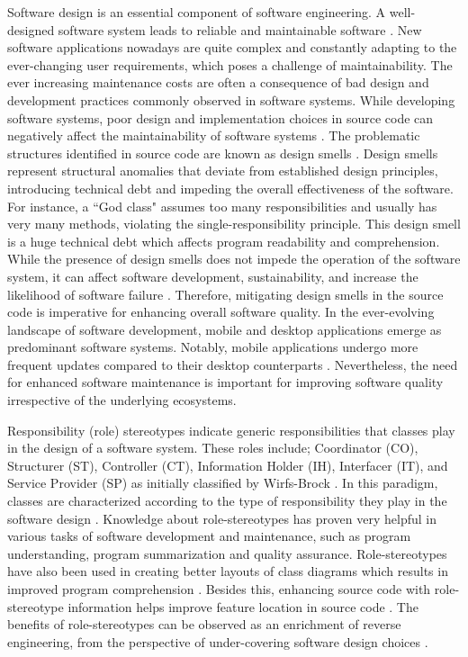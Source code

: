 \documentclass[AMA,Times1COL]{WileyNJDv5} %
\begin{document}
Software design is an essential component of software engineering. A well-designed software system leads to reliable and maintainable software \cite{imran2019design, imran2022qualitative}. New software applications nowadays are quite complex and constantly adapting to the ever-changing user requirements, which poses a challenge of maintainability. The ever increasing maintenance costs \cite{jha2019deep} are often a consequence of bad design and development practices commonly observed in software systems. While developing software systems, poor design and implementation choices in source code can negatively affect the maintainability of software systems \cite{palomba2018diffuseness}. The problematic structures identified in source code are known as design smells \cite{kaur2015influence,aversano2020empirical,imran2022qualitative}. Design smells represent structural anomalies that deviate from established design principles, introducing technical debt and impeding the overall effectiveness of the software. For instance, a ``God class" assumes too many responsibilities and usually has very many methods, violating the single-responsibility principle. This design smell is a huge technical debt which affects program readability and comprehension. While the presence of design smells does not impede the operation of the software system, it can affect software development, sustainability, and increase the likelihood of software failure \cite{turkistani2019reducing}. Therefore, mitigating design smells in the source code is imperative for enhancing overall software quality. In the ever-evolving landscape of software development, mobile and desktop applications emerge as predominant software systems. Notably, mobile applications undergo more frequent updates compared to their desktop counterparts \cite{mcilroy2016fresh}. Nevertheless, the need for enhanced software maintenance is important for improving software quality irrespective of the underlying ecosystems. 

Responsibility (role) stereotypes indicate generic responsibilities that classes play in the design of a software system. These roles include; Coordinator (CO), Structurer (ST), Controller (CT), Information Holder (IH), Interfacer (IT), and Service Provider (SP) as initially classified by Wirfs-Brock \cite{wirfs2006characterizing}. In this paradigm, classes are characterized according to the type of responsibility they play in the software design \cite{wirfs2006characterizing}. Knowledge about role-stereotypes has proven very helpful in various tasks of software development and maintenance, such as program understanding, program summarization and quality assurance. Role-stereotypes have also been used in creating better layouts of class diagrams which results in improved program comprehension \cite{genero2008does,nurwidyantoro2019automated, sharif2009effect,ho2022role}.  Besides this, enhancing source code with role-stereotype information helps improve feature location in source code \cite{alhindawi2013improving}. The benefits of role-stereotypes can be observed as an enrichment of reverse engineering, from the perspective of under-covering software design choices \cite{nurwidyantoro2019automated, ho2022role}.
\end{document}
